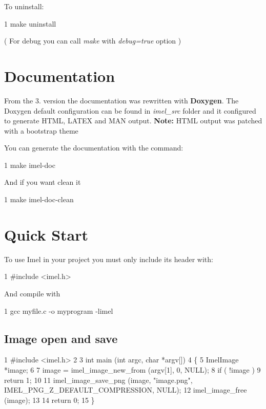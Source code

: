 To uninstall\+: 
\begin{DoxyCode}
1 make uninstall
\end{DoxyCode}


( For debug you can call {\itshape make} with {\itshape debug=true} option )

\section*{Documentation}

From the 3. version the documentation was rewritten with {\bfseries Doxygen}. The Doxygen default configuration can be found in {\itshape imel\+\_\+src} folder and it configured to generate H\+T\+ML, L\+A\+T\+EX and M\+AN output. {\bfseries Note\+:} H\+T\+ML output was patched with a bootstrap theme

You can generate the documentation with the command\+: 
\begin{DoxyCode}
1 make imel-doc
\end{DoxyCode}


And if you want clean it 
\begin{DoxyCode}
1 make imel-doc-clean
\end{DoxyCode}


\section*{Quick Start}

To use Imel in your project you must only include its header with\+: 
\begin{DoxyCode}
1 #include <imel.h>
\end{DoxyCode}


And compile with 
\begin{DoxyCode}
1 gcc myfile.c -o myprogram -limel
\end{DoxyCode}


\subsection*{Image open and save}


\begin{DoxyCode}
1 #include <imel.h>
2 
3 int main (int argc, char *argv[]) 
4 \{
5  ImelImage *image;
6 
7  image = imel\_image\_new\_from (argv[1], 0, NULL);
8  if ( !image )
9       return 1;
10 
11  imel\_image\_save\_png (image, "image.png", IMEL\_PNG\_Z\_DEFAULT\_COMPRESSION, NULL);
12  imel\_image\_free (image);
13 
14  return 0;
15 \}
\end{DoxyCode}


